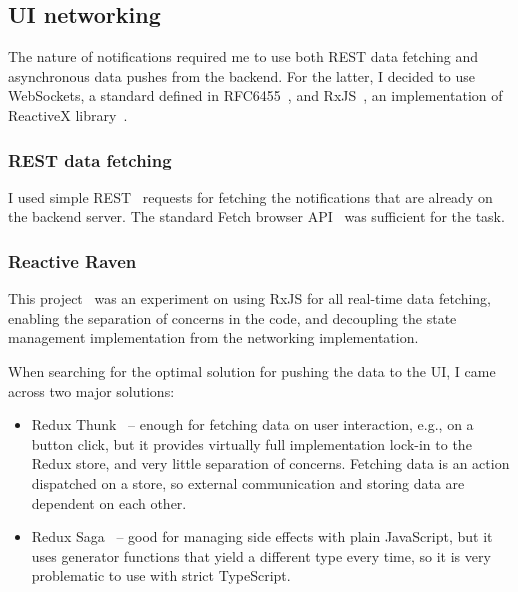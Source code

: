 \subsection{UI networking}\label{sec:ui-networking}

The nature of notifications required me to use
both REST data fetching and asynchronous data pushes from the backend.
For the latter, I decided to use WebSockets,
a standard defined in RFC6455~\cite{fette_rfc6455_2011}, and
RxJS~\cite{lesh_rxjs_2022}, an implementation of
ReactiveX library~\cite{gross_reactivex_2021}.

\subsubsection{REST data fetching}\label{sec:rest-data-fetching}

I used simple REST~\cite{perrier_rest_2022} requests
for fetching the notifications
that are already on the backend server.
The standard Fetch browser API~\cite{perrier_fetch_2022}
was sufficient for the task.

\subsubsection{Reactive Raven}\label{sec:reactive-raven}

This project~\cite{sewera_reactive_2022} was an experiment
on using RxJS for all real-time data fetching,
enabling the separation of concerns in the code,
and decoupling the state management implementation
from the networking implementation.

When searching for the optimal solution for pushing the data to the UI,
I came across two major solutions:

\begin{itemize}
      \item
            Redux Thunk~\cite{gaeraon_redux_2022-1} --
            enough for fetching data on user interaction,
            e.g., on a button click,
            but it provides virtually full implementation lock-in
            to the Redux store, and very little separation of concerns.
            Fetching data is an action dispatched on a store,
            so external communication and storing data are dependent on each other.
      \item
            Redux Saga~\cite{elouafi_redux_2022} --
            good for managing side effects with plain JavaScript,
            but it uses generator functions
            that yield a different type every time,
            so it is very problematic to use with strict TypeScript.
\end{itemize}


